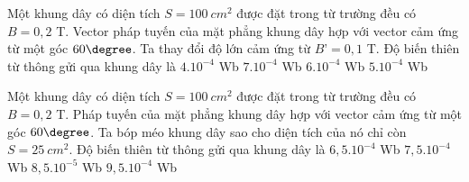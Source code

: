 \begin{vidu}%
Một khung dây có diện tích $S=100 \ cm^2$ được đặt trong từ trường đều có $B = 0,2$ T. Vector pháp tuyến của mặt phẳng khung dây hợp với vector cảm ứng từ một góc $60\degree$. Ta thay đổi độ lớn cảm ứng từ $B’ = 0,1$ T. Độ biến thiên từ thông gửi qua khung dây là
\choice
{$4.10^{-4}$ Wb}
{$7.10^{-4}$ Wb}
{$6.10^{-4}$ Wb}
{\True $5.10^{-4}$ Wb}
\end{vidu}
\begin{vidu}%
Một khung dây có diện tích $S=100\ cm^2$  được đặt trong từ trường đều có $B = 0,2$ T. Pháp tuyến của  mặt phẳng khung dây hợp với vector cảm ứng từ một góc $60\degree$. Ta bóp méo khung dây sao cho diện tích của nó chỉ còn $S=25\ cm^2$. Độ biến thiên từ thông gửi qua khung dây là
\choice
{$6,5.10^{-4}$ Wb}
{\True $7,5.10^{-4}$ Wb}
{$8,5.10^{-5}$ Wb}
{$9,5.10^{-4}$ Wb}
\end{vidu}
